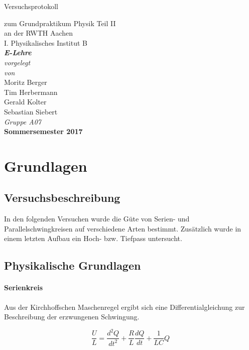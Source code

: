 \documentclass[12pt,a4paper]{article}
\author{Tim}
\begin{document}
	\setlength{\parindent}{0pt} 
	\begin{center}
		{\LARGE Versuchsprotokoll}\\
		\begin{large}
			zum Grundpraktikum Physik Teil II\\[0.4cm]
			an der RWTH Aachen\\
			I. Physikalisches Institut B\\[4.5cm]
			\Large\textbf{\textsl{E-Lehre}}\\[4cm]
			\normalsize\textit{vorgelegt\\von}\\[0.4cm]
			\large{Moritz Berger\\Tim Herbermann\\Gerald Kolter\\Sebastian Siebert}\\[1cm]
			\large \textit{Gruppe A07} \\ [3cm]
			\large \textbf{Sommersemester 2017}
		\end{large}
	\end{center}
	\newpage
	
	\tableofcontents
	\newpage


\section{Grundlagen}

\subsection{Versuchsbeschreibung}
In den folgenden Versuchen wurde die Güte von Serien- und Parallelschwingkreisen auf verschiedene Arten bestimmt. Zusätzlich wurde in einem letzten Aufbau ein Hoch- bzw. Tiefpass untersucht.

\subsection{Physikalische Grundlagen}

\paragraph{Serienkreis}
Aus der Kirchhoffschen Maschenregel ergibt sich eine Differentialgleichung zur Beschreibung der erzwungenen Schwingung.

\begin{equation}
\frac{U}{L} = \frac{d^2 Q}{dt^2}+\frac{R}{L}\frac{dQ}{dt}+\frac{1}{LC} Q
\end{equation}
\end{document}
